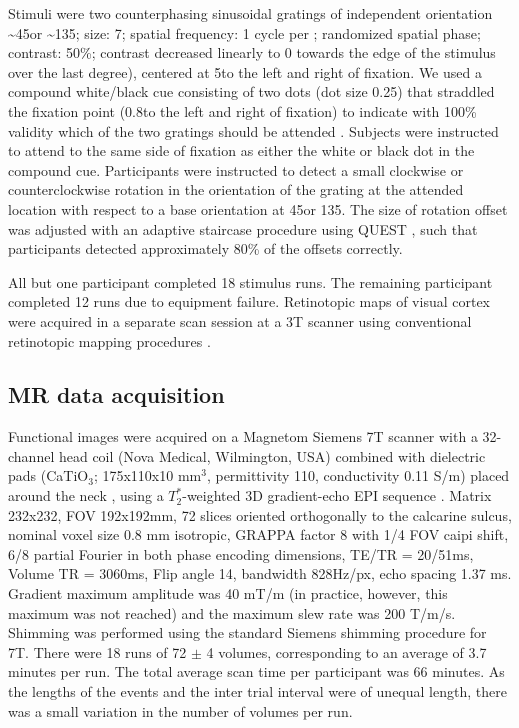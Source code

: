 \documentclass[9pt,lineno]{aperture}
\begin{document}
Stimuli were two counterphasing sinusoidal gratings of independent orientation \textasciitilde45\textdegree or \textasciitilde135\textdegree; size: 7\textdegree; spatial frequency: 1 cycle per \textdegree; randomized spatial phase; contrast: 50\%; contrast decreased linearly to 0 towards the edge of the stimulus over the last degree), centered at 5\textdegree to the left and right of fixation. We used a compound white/black cue consisting of two dots (dot size 0.25\textdegree) that straddled the fixation point (0.8\textdegree to the left and right of fixation) to indicate with 100\% validity which of the two gratings should be attended \citep{Jehee2011}. Subjects were instructed to attend to the same side of fixation as either the white or black dot in the compound cue.
Participants were instructed to detect a small clockwise or counterclockwise rotation in the orientation of the grating at the attended location with respect to a base orientation at 45\textdegree or 135\textdegree. The size of rotation offset was adjusted with an adaptive staircase procedure using QUEST \citep{Watson1983}, such that participants detected approximately 80\% of the offsets correctly. 

All but one participant completed 18 stimulus runs. The remaining participant completed 12 runs due to equipment failure.
Retinotopic maps of visual cortex were acquired in a separate scan session at a 3T scanner using conventional retinotopic mapping procedures \citep{Sereno1995,DeYoe1996,Engel1997}.

\subsection{MR data acquisition}
Functional images were acquired on a Magnetom Siemens 7T scanner with a 32-channel head coil (Nova Medical, Wilmington, USA) combined with dielectric pads (CaTiO$_3$; 175x110x10 mm$^3$, permittivity 110, conductivity 0.11 S/m) placed around the neck \citep{Teeuwisse2012}, using a $T_2^*$-weighted 3D gradient-echo EPI sequence \citep{Poser2010}. Matrix 232x232, FOV 192x192mm, 72 slices oriented orthogonally to the calcarine sulcus, nominal voxel size 0.8 mm isotropic, GRAPPA factor 8 with 1/4 FOV caipi shift, 6/8 partial Fourier in both phase encoding dimensions,  TE/TR = 20/51ms, Volume TR = 3060ms, Flip angle 14\textdegree, bandwidth 828Hz/px, echo spacing 1.37 ms. Gradient maximum amplitude was 40 mT/m (in practice, however, this maximum was not reached) and the maximum slew rate was 200 T/m/s. Shimming was performed using the standard Siemens shimming procedure for 7T. There were 18 runs of 72 $\pm$ 4 volumes, corresponding to an average of 3.7 minutes per run. The total average scan time per participant was 66 minutes. As the lengths of the events and the inter trial interval were of unequal length, there was a small variation in the number of volumes per run.
\end{document}

